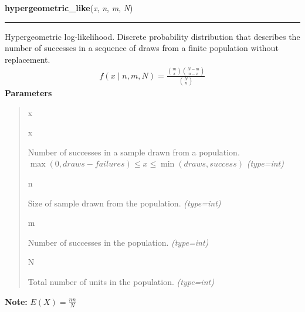 \hspace{.8\funcindent}\begin{boxedminipage}{\funcwidth}

    \raggedright \textbf{hypergeometric\_like}(\textit{x}, \textit{n}, \textit{m}, \textit{N})

    \vspace{-1.5ex}

    \rule{\textwidth}{1pt}
\setlength{\parskip}{2ex}

Hypergeometric log-likelihood. Discrete probability distribution that
describes the number of successes in a sequence of draws from a finite
population without replacement.
\begin{equation*}\begin{split}f(x \mid n, m, N) = \frac{\binom{m}{x}\binom{N-m}{n-x}}{\binom{N}{n}}\end{split}\end{equation*}\setlength{\parskip}{1ex}
      \textbf{Parameters}
      \vspace{-1ex}

      \begin{quote}
        \begin{Ventry}{x}

          \item[x]


Number of successes in a sample drawn from a population.
$\max(0, draws-failures) \leq x \leq \min(draws, success)$
            {\it (type=int)}

          \item[n]


Size of sample drawn from the population.
            {\it (type=int)}

          \item[m]


Number of successes in the population.
            {\it (type=int)}

          \item[N]


Total number of units in the population.
            {\it (type=int)}

        \end{Ventry}

      \end{quote}

\textbf{Note:} 
$E(X) = \frac{n n}{N}$


    \end{boxedminipage}

    \label{pymc:distributions:inverse_gamma_like}

